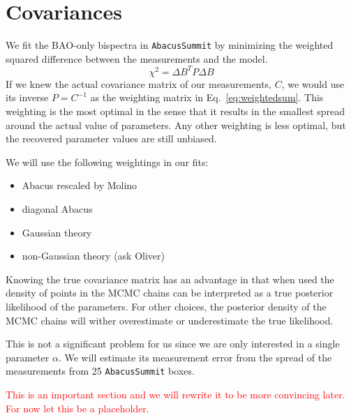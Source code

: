 \section{Covariances}
\label{sec:covariances}

We fit the BAO-only bispectra in \texttt{AbacusSummit} by minimizing the weighted squared difference between the measurements and the model. 
\begin{equation}
\label{eq:weightedsum}
    \chi^2 = \Delta B^T P \Delta B
\end{equation}
If we knew the actual covariance matrix of our measurements, $C$, we would use its inverse $P=C^{-1}$ as the weighting matrix in Eq.~\eqref{eq:weightedsum}. This weighting is the most optimal in the sense that it results in the smallest spread around the actual value of parameters. Any other weighting is less optimal, but the recovered parameter values are still unbiased. 

We will use the following weightings in our fits:
\begin{itemize}
\item Abacus rescaled by Molino
\item diagonal Abacus
\item Gaussian theory
\item non-Gaussian theory (ask Oliver)
\end{itemize}

Knowing the true covariance matrix has an advantage in that when used the density of points in the MCMC chains can be interpreted as a true posterior likelihood of the parameters. For other choices, the posterior density of the MCMC chains will wither overestimate or underestimate the true likelihood.

This is not a significant problem for us since we are only interested in a single parameter $\alpha$. We will estimate its measurement error from the spread of the measurements from 25 \texttt{AbacusSummit} boxes.

\textcolor{red}{This is an important section and we will rewrite it to be more convincing later. For now let this be a placeholder.}